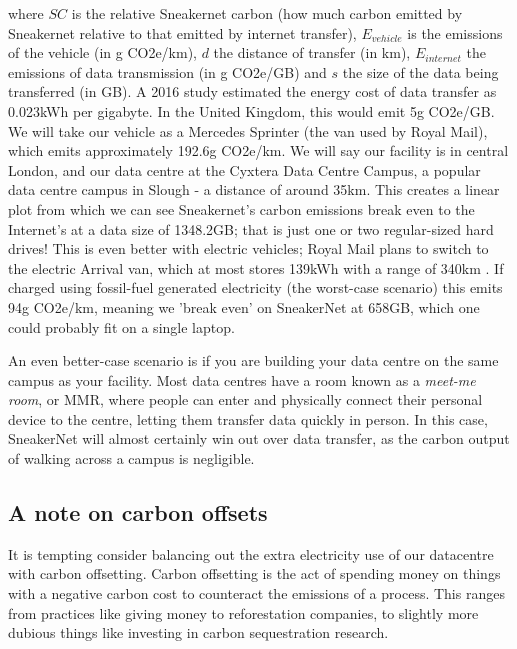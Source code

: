 \documentclass{article}
\begin{document}
where $SC$ is the relative Sneakernet carbon (how much carbon emitted by Sneakernet relative to that emitted by internet transfer), $E_{vehicle}$ is the emissions of the vehicle (in g CO2e/km), $d$ the distance of transfer (in km), $E_{internet}$ the emissions of data transmission (in g CO2e/GB) and $s$ the size of the data being transferred (in GB). A 2016 study estimated the energy cost of data transfer as 0.023kWh per gigabyte. \citep{aslan2018electricity} In the United Kingdom, this would emit 5g CO2e/GB. We will take our vehicle as a Mercedes Sprinter (the van used by Royal Mail), which emits approximately 192.6g CO2e/km. \citep{mercedes2019sprinter} We will say our facility is in central London, and our data centre at the Cyxtera Data Centre Campus, a popular data centre campus in Slough - a distance of around 35km. This creates a linear plot from which we can see Sneakernet's carbon emissions break even to the Internet's at a data size of 1348.2GB; that is just one or two regular-sized hard drives! This is even better with electric vehicles; Royal Mail plans to switch to the electric Arrival van, which at most stores 139kWh with a range of 340km \citep{hubbard2021new}. If charged using fossil-fuel generated electricity (the worst-case scenario) this emits 94g CO2e/km, meaning we 'break even' on SneakerNet at 658GB, which one could probably fit on a single laptop. \newline

An even better-case scenario is if you are building your data centre on the same campus as your facility. Most data centres have a room known as a \emph{meet-me room}, or MMR, where people can enter and physically connect their personal device to the centre, letting them transfer data quickly in person. In this case, SneakerNet will almost certainly win out over data transfer, as the carbon output of walking across a campus is negligible. \newline


\subsection{A note on carbon offsets}
It is tempting consider balancing out the extra electricity use of our datacentre with carbon offsetting. Carbon offsetting is the act of spending money on things with a negative carbon cost to counteract the emissions of a process. This ranges from practices like giving money to reforestation companies, to slightly more dubious things like investing in carbon sequestration research. \newline
\end{document}
